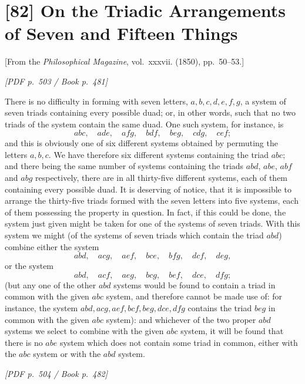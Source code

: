 \documentclass[11pt]{article}
\newcommand{\Page}[2]{\bigskip\noindent\textit{[PDF p.~#1 / Book p.~#2]}\par\smallskip}
\begin{document}
\section*{[82] On the Triadic Arrangements of Seven and Fifteen Things}

\begin{center}
[From the \textit{Philosophical Magazine}, vol.~xxxvii. (1850), pp.~50--53.]
\end{center}

\Page{503}{481}

There is no difficulty in forming with seven letters, $a,b,c,d,e,f,g$, a system of
seven triads containing every possible duad; or, in other words, such that no two
triads of the system contain the same duad. One such system, for instance, is
\[
        abc,\quad ade,\quad afg,\quad bdf,\quad beg,\quad cdg,\quad cef;
\]
and this is obviously one of six different systems obtained by permuting the letters
$a,b,c$. We have therefore six different systems containing the triad $abc$; and
there being the same number of systems containing the triads $abd$, $abe$, $abf$ and
$abg$ respectively, there are in all thirty-five different systems, each of them
containing every possible duad. It is deserving of notice, that it is impossible to
arrange the thirty-five triads formed with the seven letters into five systems, each
of them possessing the property in question. In fact, if this could be done, the
system just given might be taken for one of the systems of seven triads. With this
system we might (of the systems of seven triads which contain the triad $abd$)
combine either the system
\[
        abd,\quad acg,\quad aef,\quad bce,\quad bfg,\quad dcf,\quad deg,
\]
or the system
\[
        abd,\quad acf,\quad aeg,\quad bcg,\quad bef,\quad dce,\quad dfg;
\]
(but any one of the other $abd$ systems would be found to contain a triad in
common with the given $abc$ system, and therefore cannot be made use of: for instance,
the system $abd, acg, aef, bcf, beg, dce, dfg$ contains the triad $beg$ in common
with the given $abc$ system): and whichever of the two proper $abd$ systems we
select to combine with the given $abc$ system, it will be found that there is no
$abe$ system which does not contain some triad in common, either with the $abc$
system or with the $abd$ system.

\Page{504}{482}
\end{document}
